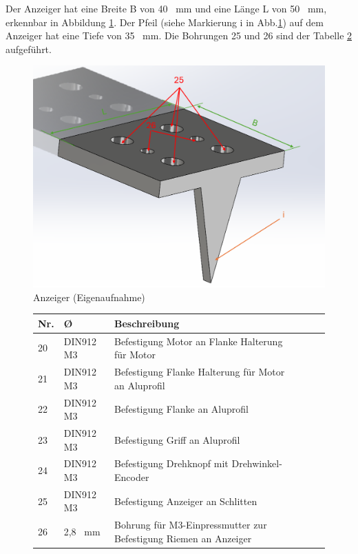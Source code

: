 Der Anzeiger hat eine Breite B von 40 \ mm und eine Länge L von 50 \ mm, erkennbar in Abbildung \ref{AnzeigerK}. Der Pfeil (siehe Markierung i in Abb.\ref{AnzeigerK}) auf dem Anzeiger hat eine Tiefe von 35 \ mm. Die Bohrungen 25 und 26 sind der Tabelle \ref{BohrungenAK} aufgeführt.

	\begin{figure}[H]
		\begin{center}
			\includegraphics[width=\textwidth]{Images/Konstruktion/AnzeigerK.png}
			\caption{Anzeiger (Eigenaufnahme)} \label{AnzeigerK}
		\end{center}
	\end{figure}  
	 
	 \begin{figure}[H]
	 	\begin{center}
	 		\fontsize{8}{10}\selectfont
	 		\begin{tabularx}{\textwidth}{|p{0.4cm}|p{1.2cm}|X|X|X|X|} 
	 			\hline 
	 			\textbf{Nr.} & \textbf{\O} & \textbf{Beschreibung} \\ \hline
	 			20 & DIN912 M3 & Befestigung Motor an Flanke Halterung für Motor \\ \hline
	 			21 & DIN912 M3 & Befestigung Flanke Halterung für Motor an Aluprofil \\ \hline
	 			22 & DIN912 M3 & Befestigung Flanke an Aluprofil  \\ \hline
	 			23 & DIN912 M3 & Befestigung Griff an Aluprofil \\ \hline
	 			24 & DIN912 M3 & Befestigung Drehknopf mit Drehwinkel-Encoder \\ \hline
	 			25 & DIN912 M3 & Befestigung Anzeiger an Schlitten \\ \hline
	 			26 & 2,8 \ mm & Bohrung für M3-Einpressmutter zur Befestigung Riemen an Anzeiger \\ \hline
	 		\end{tabularx}
	 			\label{BohrungenAK}
	 	\end{center}
	 \end{figure}

